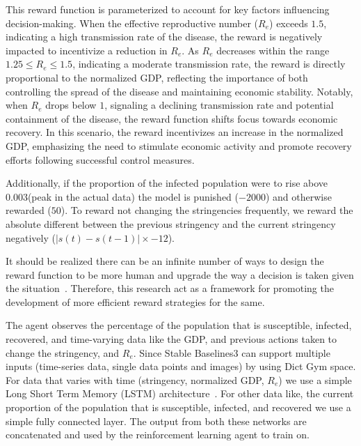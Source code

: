 \documentclass[tikz,fleqn,12pt]{wlscirep}
\begin{document}
This reward function is parameterized to account for key factors influencing decision-making. When the effective reproductive number ($R_e$) exceeds $1.5$, indicating a high transmission rate of the disease, the reward is negatively impacted to incentivize a reduction in $R_e$. As $R_e$ decreases within the range $1.25 \leq R_e \leq 1.5$, indicating a moderate transmission rate, the reward is directly proportional to the normalized GDP, reflecting the importance of both controlling the spread of the disease and maintaining economic stability. Notably, when $R_e$ drops below $1$, signaling a declining transmission rate and potential containment of the disease, the reward function shifts focus towards economic recovery. In this scenario, the reward incentivizes an increase in the normalized GDP, emphasizing the need to stimulate economic activity and promote recovery efforts following successful control measures.

Additionally, if the proportion of the infected population were to rise above 0.003(peak in the actual data) the model is punished ($-2000$) and otherwise rewarded ($50$). To reward not changing the stringencies frequently, we reward the absolute different between the previous stringency and the current stringency negatively ($|s(t) - s(t-1)| \times -12$).

It should be realized there can be an infinite number of ways to design the reward function to be more human and upgrade the way a decision is taken given the situation~\cite{AWSDeepRacer}. Therefore, this research act as a  framework for promoting the development of more efficient reward strategies for the same. 

The agent observes the percentage of the population that is susceptible, infected, recovered, and time-varying data like the GDP, and previous actions taken to change the stringency, and $R_e$. Since Stable Baselines3 can support multiple inputs (time-series data, single data points and images) by using Dict Gym space. For data that varies with time (stringency, normalized GDP, $R_e$) we use a simple Long Short Term Memory (LSTM) architecture~\cite{LSTM}. For other data like, the current proportion of the population that is susceptible, infected, and recovered we use a simple fully connected layer. The output from both these networks are concatenated and used by the reinforcement learning agent to train on.
\end{document}
